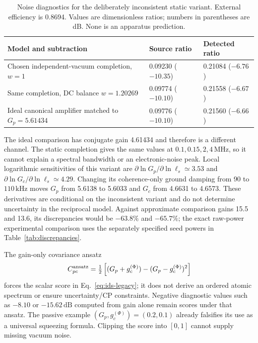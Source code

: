 \documentclass[11pt,a4paper]{article}
\newcommand{\MHz}{\,\mathrm{MHz}}
\newcommand{\kHz}{\,\mathrm{kHz}}
\newcommand{\dB}{\,\mathrm{dB}}
\begin{document}
\begin{table}[ht]
\centering\small
\caption{Noise diagnostics for the deliberately inconsistent static variant.
External efficiency is 0.8694. Values are dimensionless ratios; numbers in
parentheses are dB. None is an apparatus prediction.}
\label{tab:gc-countermodel-noise}
\begin{tabularx}{\textwidth}{Y L{3.2cm}L{3.2cm}}
\toprule
Model and subtraction&Source ratio&Detected ratio\\
\midrule
Chosen independent-vacuum completion, $w=1$&0.09230 ($-10.35$)&0.21084 ($-6.76$)\\
Same completion, DC balance $w=1.20269$&0.09774 ($-10.10$)&0.21558 ($-6.67$)\\
Ideal canonical amplifier matched to $G_p=5.61434$&0.09776 ($-10.10$)&0.21560 ($-6.66$)\\
\bottomrule
\end{tabularx}
\end{table}
The ideal comparison has conjugate gain 4.61434 and therefore is a different
channel. The static completion gives the same values at $0.1,0.15,2,4\MHz$,
so it cannot explain a spectral bandwidth or an electronic-noise peak.
Local logarithmic sensitivities of this variant are
$\partial\ln G_p/\partial\ln\ell_s\simeq3.53$ and
$\partial\ln G_c/\partial\ln\ell_s\simeq4.29$. Changing its coherence-only
ground damping from 90 to $110\kHz$ moves $G_p$ from 5.6138 to 5.6033 and
$G_c$ from 4.6631 to 4.6573. These derivatives are conditional on the
inconsistent variant and do not determine uncertainty in the reciprocal
model. Against approximate comparison gains 15.5 and 13.6, its discrepancies
would be $-63.8\%$ and $-65.7\%$; the exact raw-power experimental comparison
uses the separately specified seed powers in Table~\ref{tab:discrepancies}.

The gain-only covariance ansatz
\begin{equation}
 C_{pc}^{\rm ansatz}=\tfrac12\left[(G_p+g_c^{(\Phi)})
                    -(G_p-g_c^{(\Phi)})^2\right]
 \label{eq:gc-gain-covariance-ansatz}
\end{equation}
forces the scalar score in Eq.~\eqref{eq:ids-legacy}; it does not derive
an ordered atomic spectrum or ensure uncertainty/CP constraints. Negative
diagnostic values such as $-8.10$ or $-15.62\dB$ computed from gain alone
remain scores under that ansatz. The passive example $(G_p,g_c^{(\Phi)})=
(0.2,0.1)$ already falsifies its use as a universal squeezing formula.
Clipping the score into $[0,1]$ cannot supply missing vacuum noise.
\end{document}
